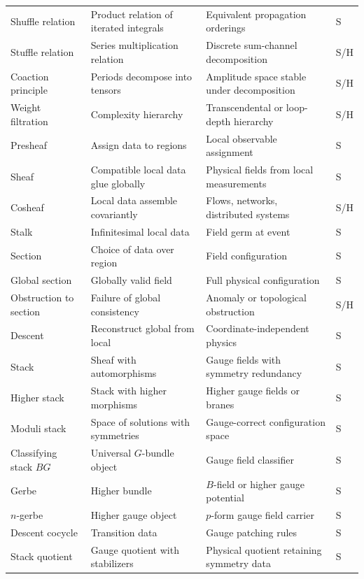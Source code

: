 \documentclass[11pt]{article}
\newcommand{\status}[1]{\textsf{#1}}
\newcommand{\entry}[4]{#1 & #2 & #3 & \status{#4}\\}
\begin{document}
\begin{longtable}{@{}>{\raggedright\arraybackslash}p{}>{\raggedright\arraybackslash}p{}>{\raggedright\arraybackslash}p{}>{\centering\arraybackslash}p{}@{}}
\entry{Shuffle relation}{Product relation of iterated integrals}{Equivalent propagation orderings}{S}
\entry{Stuffle relation}{Series multiplication relation}{Discrete sum-channel decomposition}{S/H}
\entry{Coaction principle}{Periods decompose into tensors}{Amplitude space stable under decomposition}{S/H}
\entry{Weight filtration}{Complexity hierarchy}{Transcendental or loop-depth hierarchy}{S/H}
\entry{Presheaf}{Assign data to regions}{Local observable assignment}{S}
\entry{Sheaf}{Compatible local data glue globally}{Physical fields from local measurements}{S}
\entry{Cosheaf}{Local data assemble covariantly}{Flows, networks, distributed systems}{S/H}
\entry{Stalk}{Infinitesimal local data}{Field germ at event}{S}
\entry{Section}{Choice of data over region}{Field configuration}{S}
\entry{Global section}{Globally valid field}{Full physical configuration}{S}
\entry{Obstruction to section}{Failure of global consistency}{Anomaly or topological obstruction}{S/H}
\entry{Descent}{Reconstruct global from local}{Coordinate-independent physics}{S}
\entry{Stack}{Sheaf with automorphisms}{Gauge fields with symmetry redundancy}{S}
\entry{Higher stack}{Stack with higher morphisms}{Higher gauge fields or branes}{S}
\entry{Moduli stack}{Space of solutions with symmetries}{Gauge-correct configuration space}{S}
\entry{Classifying stack $BG$}{Universal $G$-bundle object}{Gauge field classifier}{S}
\entry{Gerbe}{Higher bundle}{$B$-field or higher gauge potential}{S}
\entry{$n$-gerbe}{Higher gauge object}{$p$-form gauge field carrier}{S}
\entry{Descent cocycle}{Transition data}{Gauge patching rules}{S}
\entry{Stack quotient}{Gauge quotient with stabilizers}{Physical quotient retaining symmetry data}{S}
\end{longtable}
\end{document}
